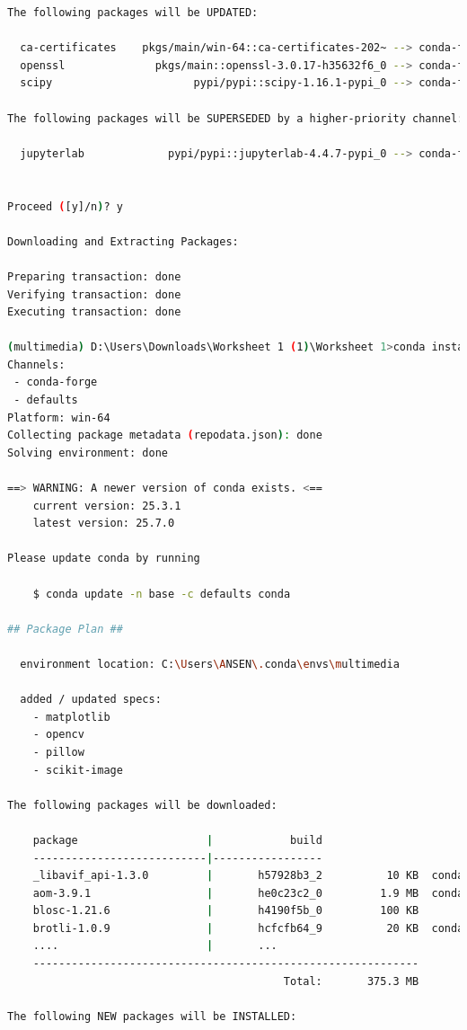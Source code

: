 \documentclass[11pt,a4paper]{article}
\begin{document}
\begin{itemize}
\begin{lstlisting}[language=bash, caption=Output instalansi library]
The following packages will be UPDATED:

  ca-certificates    pkgs/main/win-64::ca-certificates-202~ --> conda-forge/noarch::ca-certificates-2025.8.3-h4c7d964_0
  openssl              pkgs/main::openssl-3.0.17-h35632f6_0 --> conda-forge::openssl-3.5.2-h725018a_0
  scipy                      pypi/pypi::scipy-1.16.1-pypi_0 --> conda-forge/win-64::scipy-1.16.2-py311h9a1c30b_0

The following packages will be SUPERSEDED by a higher-priority channel:

  jupyterlab             pypi/pypi::jupyterlab-4.4.7-pypi_0 --> conda-forge/noarch::jupyterlab-4.4.7-pyhd8ed1ab_0


Proceed ([y]/n)? y

Downloading and Extracting Packages:

Preparing transaction: done
Verifying transaction: done
Executing transaction: done

(multimedia) D:\Users\Downloads\Worksheet 1 (1)\Worksheet 1>conda install -c conda-forge opencv pillow scikit-image matplotlib
Channels:
 - conda-forge
 - defaults
Platform: win-64
Collecting package metadata (repodata.json): done
Solving environment: done

==> WARNING: A newer version of conda exists. <==
    current version: 25.3.1
    latest version: 25.7.0

Please update conda by running

    $ conda update -n base -c defaults conda

## Package Plan ##

  environment location: C:\Users\ANSEN\.conda\envs\multimedia

  added / updated specs:
    - matplotlib
    - opencv
    - pillow
    - scikit-image

The following packages will be downloaded:

    package                    |            build
    ---------------------------|-----------------
    _libavif_api-1.3.0         |       h57928b3_2          10 KB  conda-forge
    aom-3.9.1                  |       he0c23c2_0         1.9 MB  conda-forge
    blosc-1.21.6               |       h4190f5b_0         100 KB
    brotli-1.0.9               |       hcfcfb64_9          20 KB  conda-forge
    ....                       |       ...
    ------------------------------------------------------------
                                           Total:       375.3 MB

The following NEW packages will be INSTALLED:


\end{lstlisting}
\end{itemize}
\end{document}
